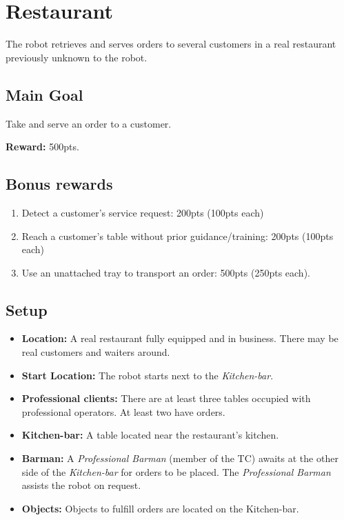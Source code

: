 \section{Restaurant}
\label{test:restaurant}
The robot retrieves and serves orders to several customers in a real restaurant previously unknown to the robot.


\subsection*{Main Goal}
Take and serve an order to a customer.

\noindent\textbf{Reward:} 500pts.

\subsection*{Bonus rewards}
\begin{enumerate}[nosep]
	\item Detect a customer's service request: 200pts (100pts each)
	\item Reach a customer's table without prior guidance/training: 200pts (100pts each)
	\item Use an unattached tray to transport an order: 500pts (250pts each).
\end{enumerate}

\subsection*{Setup}
\begin{itemize}[nosep]
	\item \textbf{Location:} A real restaurant fully equipped and in business.
	There may be real customers and waiters around.

	\item \textbf{Start Location:} The robot starts next to the \emph{Kitchen-bar}.

	\item \textbf{Professional clients:} There are at least three tables occupied with professional operators. At least two have orders.

    \item \textbf{Kitchen-bar:} A table located near the restaurant's kitchen.

	\item \textbf{Barman:} A \emph{Professional Barman} (member of the TC) awaits at the other side of the \emph{Kitchen-bar} for orders to be placed. The \emph{Professional Barman} assists the robot on request.

	\item \textbf{Objects:} Objects to fulfill orders are located on the Kitchen-bar.
\end{itemize}


